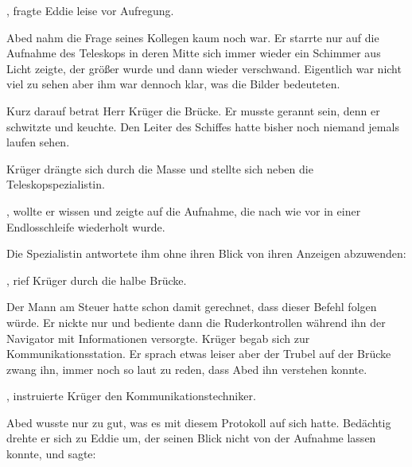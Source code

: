 \par

, fragte Eddie leise vor Aufregung. 

\par

Abed nahm die Frage seines Kollegen kaum noch war. Er starrte nur auf die Aufnahme des Teleskops in deren Mitte sich immer wieder ein Schimmer aus Licht zeigte, der größer wurde und dann wieder verschwand. Eigentlich war nicht viel zu sehen aber ihm war dennoch klar, was die Bilder bedeuteten.

\par

Kurz darauf betrat Herr Krüger die Brücke. Er musste gerannt sein, denn er schwitzte und keuchte. Den Leiter des Schiffes hatte bisher noch niemand jemals laufen sehen.

\par

Krüger drängte sich durch die Masse und stellte sich neben die Teleskopspezialistin.

\par

, wollte er wissen und zeigte auf die Aufnahme, die nach wie vor in einer Endlosschleife wiederholt wurde.

\par

Die Spezialistin antwortete ihm ohne ihren Blick von ihren Anzeigen abzuwenden: 

\par

, rief Krüger durch die halbe Brücke.

\par

Der Mann am Steuer hatte schon damit gerechnet, dass dieser Befehl folgen würde. Er nickte nur und bediente dann die Ruderkontrollen während ihn der Navigator mit Informationen versorgte. Krüger begab sich zur Kommunikationsstation. Er sprach etwas leiser aber der Trubel auf der Brücke zwang ihn, immer noch so laut zu reden, dass Abed ihn verstehen konnte.

\par

, instruierte Krüger den Kommunikationstechniker.

\par

Abed wusste nur zu gut, was es mit diesem Protokoll auf sich hatte. Bedächtig drehte er sich zu Eddie um, der seinen Blick nicht von der Aufnahme lassen konnte, und sagte: 